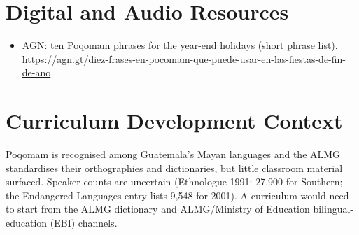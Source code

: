 \documentclass[12pt]{article}
\begin{document}
\section{Digital and Audio Resources}
\begin{itemize}
\item AGN: ten Poqomam phrases for the year-end holidays (short phrase list). \url{https://agn.gt/diez-frases-en-pocomam-que-puede-usar-en-las-fiestas-de-fin-de-ano}
\end{itemize}

\section{Curriculum Development Context}
Poqomam is recognised among Guatemala's Mayan languages and the ALMG standardises their orthographies and dictionaries, but little classroom material surfaced. Speaker counts are uncertain (Ethnologue 1991: 27,900 for Southern; the Endangered Languages entry lists 9,548 for 2001). A curriculum would need to start from the ALMG dictionary and ALMG/Ministry of Education bilingual-education (EBI) channels.
\end{document}
